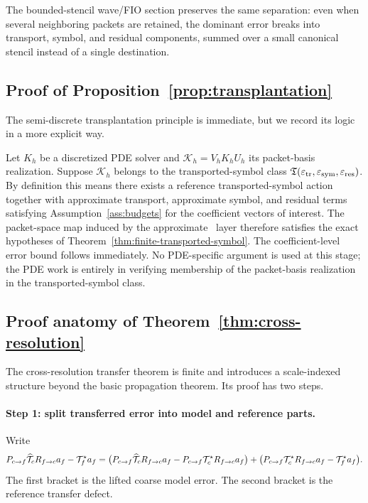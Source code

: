The bounded-stencil wave/FIO section preserves the same separation: even when several neighboring packets are retained, the dominant error breaks into transport, symbol, and residual components, summed over a small canonical stencil instead of a single destination.

\subsection{Proof of Proposition~\ref{prop:transplantation}}

The semi-discrete transplantation principle is immediate, but we record its logic in a more explicit way.

Let $K_h$ be a discretized PDE solver and $\mathcal K_h=V_hK_hU_h$ its packet-basis realization. Suppose $\mathcal K_h$ belongs to the transported-symbol class $\mathfrak T(\varepsilon_{\mathrm{tr}},\varepsilon_{\mathrm{sym}},\varepsilon_{\mathrm{res}})$. By definition this means there exists a reference transported-symbol action together with approximate transport, approximate symbol, and residual terms satisfying Assumption~\ref{ass:budgets} for the coefficient vectors of interest. The packet-space map induced by the approximate \MiNO\ layer therefore satisfies the exact hypotheses of Theorem~\ref{thm:finite-transported-symbol}. The coefficient-level error bound follows immediately. No PDE-specific argument is used at this stage; the PDE work is entirely in verifying membership of the packet-basis realization in the transported-symbol class.

\subsection{Proof anatomy of Theorem~\ref{thm:cross-resolution}}

The cross-resolution transfer theorem is finite and introduces a scale-indexed structure beyond the basic propagation theorem. Its proof has two steps.

\paragraph{Step 1: split transferred error into model and reference parts.}
Write
\[
P_{c\to f}\widehat{\mathcal T}_c R_{f\to c} a_f - \mathcal T^\star_f a_f
=
\bigl(P_{c\to f}\widehat{\mathcal T}_c R_{f\to c} a_f
-
P_{c\to f}\mathcal T^\star_c R_{f\to c} a_f\bigr)
+
\bigl(P_{c\to f}\mathcal T^\star_c R_{f\to c} a_f - \mathcal T^\star_f a_f\bigr).
\]
The first bracket is the lifted coarse model error. The second bracket is the reference transfer defect.


